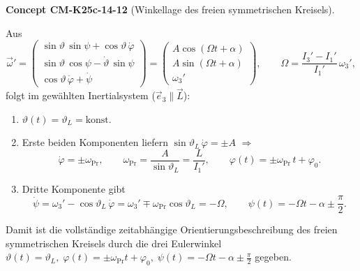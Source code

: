 \documentclass[10pt, letterpaper]{article}
\newcommand{\CustomHeading}[3]{%
  \par\medskip\noindent%
  \textbf{#1 #2} \textnormal{(#3)}.\enskip%
}
\newenvironment{CONC}[2]{\CustomHeading{Concept}{#1}{#2}}{}
\begin{document}
\begin{CONC}{CM-K25c-14-12}{Winkellage des freien symmetrischen Kreisels}
Aus
\[
\vec\omega'
=
\begin{pmatrix}
\sin\vartheta\,\sin\psi+\cos\vartheta\,\dot\varphi\\[2pt]
\sin\vartheta\,\cos\psi-\dot\vartheta\,\sin\psi\\[2pt]
\cos\vartheta\,\dot\varphi+\dot\psi
\end{pmatrix}
=
\begin{pmatrix}
A\cos(\Omega t+\alpha)\\
A\sin(\Omega t+\alpha)\\
\omega_3'
\end{pmatrix},
\qquad
\Omega=\frac{I_3'-I_1'}{I_1'}\,\omega_3',
\]
folgt im gewählt­en Inertialsystem ($\vec e_3\parallel\vec L$):

\begin{enumerate}
\item \(\vartheta(t)=\vartheta_L=\text{konst}\).

\item Erste beiden Komponenten liefern  
      \(\sin\vartheta_L\,\dot\varphi=\pm A\)  
      \(\Longrightarrow\)
      \[
        \dot\varphi=\pm\omega_{\text{Pr}}\!,
        \qquad
        \omega_{\text{Pr}}=\frac{A}{\sin\vartheta_L}
                          =\frac{L}{I_1'},
        \qquad
        \varphi(t)=\pm\omega_{\text{Pr}}\,t+\varphi_0 .
      \]

\item Dritte Komponente gibt  
      \[
        \dot\psi
        =\omega_3'-\cos\vartheta_L\,\dot\varphi
        =\omega_3'\mp\omega_{\text{Pr}}\cos\vartheta_L
        =-\Omega,
        \qquad
        \psi(t)=-\Omega t-\alpha\pm\frac{\pi}{2}.
      \]
\end{enumerate}

Damit ist die vollständige zeitabhängige Orientierungsbeschreibung des freien symmetrischen Kreisels durch die drei Eulerwinkel
\(
  \vartheta(t)=\vartheta_L,\;
  \varphi(t)=\pm\omega_{\text{Pr}}t+\varphi_0,\;
  \psi(t)=-\Omega t-\alpha\pm\frac{\pi}{2}
\)
gegeben.
\end{CONC}
\end{document}
